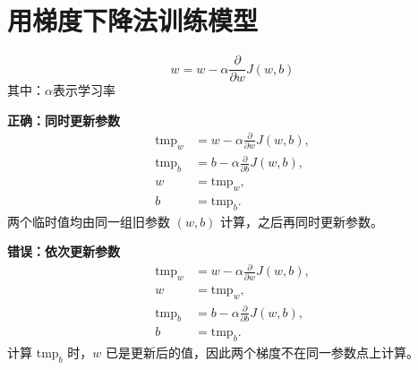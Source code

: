 \documentclass[12pt,a4paper]{ctexart}
\begin{document}
\section{用梯度下降法训练模型}
\begin{definitionbox}[批量梯度下降公式]
  $$w = w - \alpha \frac{\partial}{\partial w} J(w,b)$$
  其中：$\alpha$表示学习率
\end{definitionbox}
\begin{mistakebox}[参数更新的正确与错误方式]
  \begin{minipage}[t]{0.47\linewidth}
    \vspace{0pt}
    \small
    \textbf{正确：同时更新参数}
    \begin{align*}
      \mathrm{tmp}_w &= w-\alpha\frac{\partial}{\partial w}J(w,b), \\
      \mathrm{tmp}_b &= b-\alpha\frac{\partial}{\partial b}J(w,b), \\
      w &= \mathrm{tmp}_w, \\
      b &= \mathrm{tmp}_b.
    \end{align*}
    两个临时值均由同一组旧参数 $(w,b)$ 计算，之后再同时更新参数。
  \end{minipage}
  \hfill
  \begin{minipage}[t]{0.47\linewidth}
    \vspace{0pt}
    \small
    \textbf{错误：依次更新参数}
    \begin{align*}
      \mathrm{tmp}_w &= w-\alpha\frac{\partial}{\partial w}J(w,b), \\
      w &= \mathrm{tmp}_w, \\
      \mathrm{tmp}_b &= b-\alpha\frac{\partial}{\partial b}J(w,b), \\
      b &= \mathrm{tmp}_b.
    \end{align*}
    计算 $\mathrm{tmp}_b$ 时，$w$ 已是更新后的值，因此两个梯度不在同一参数点上计算。
  \end{minipage}
\end{mistakebox}
\end{document}
